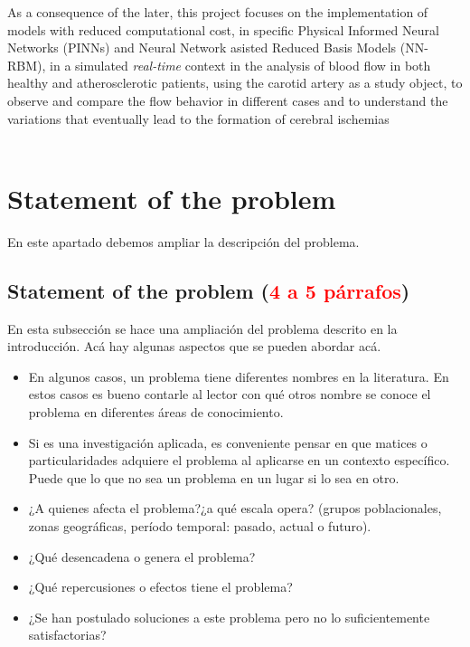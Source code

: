 \documentclass[12pt,letterpaper]{article}
\begin{document}
As a consequence of the later, this project focuses on the implementation of models with reduced computational cost, in specific Physical Informed Neural Networks (PINNs) and Neural Network asisted Reduced Basis Models (NN-RBM), in a simulated \textit{real-time} context in the analysis of blood flow in both healthy and atherosclerotic patients, using the carotid artery as a study object, to observe and compare the flow behavior in different cases and to understand the variations that eventually lead to the formation of cerebral ischemias\\~\\

\section{Statement of the problem}

En este apartado debemos ampliar la descripción del problema.

\subsection{Statement of the problem (\textcolor{red}{4 a 5 párrafos})}

En esta subsección se hace una ampliación del problema descrito en la introducción. Acá hay
algunas aspectos que se pueden abordar acá.

\begin{itemize}
\item En algunos casos, un problema tiene diferentes nombres en la literatura. En estos casos es bueno contarle al lector con qué otros nombre se conoce el problema en diferentes áreas de conocimiento.
\item Si es una investigación aplicada, es conveniente pensar en que matices o particularidades adquiere el problema al aplicarse en un contexto específico. Puede que lo que no sea un problema en un lugar si lo sea en otro.
\item ¿A quienes afecta el problema?¿a qué escala opera? (grupos poblacionales, zonas geográficas, período temporal: pasado, actual o futuro).
\item ¿Qué desencadena o genera el problema?
\item ¿Qué repercusiones o efectos tiene el problema?
\item ¿Se han postulado soluciones a este problema pero no lo suficientemente satisfactorias?
\end{itemize}
\end{document}
